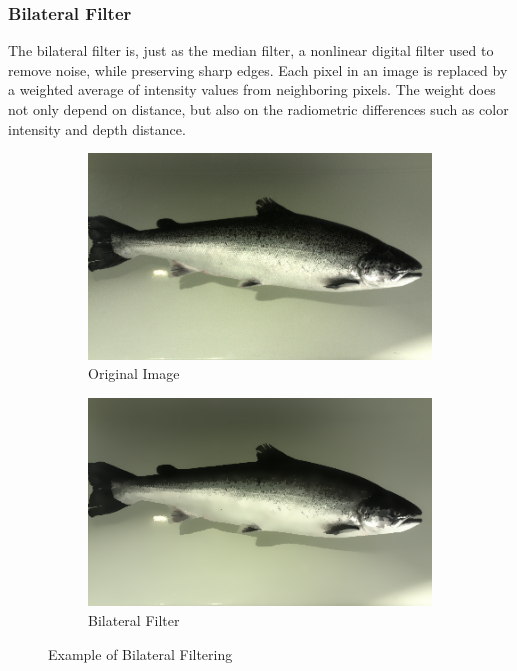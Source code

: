 \subsubsection{Bilateral Filter}
The bilateral filter is, just as the median filter, a nonlinear digital filter used to remove noise, while preserving sharp edges. Each pixel in an image is replaced by a weighted average of intensity values from neighboring pixels. The weight does not only depend on distance, but also on the radiometric differences such as color intensity and depth distance.\cite{book:digital_image_processing}\cite{website:wiki_bilateral_filter}\cite{book:machine_vision}

\begin{figure}[ht]
    \centering
    \begin{subfigure}{0.5\textwidth}
        \centering
        \includegraphics[width=.99\linewidth]{images/literature/filtering/original_fish}
        \caption{Original Image}
    \end{subfigure}%
    \begin{subfigure}{.5\textwidth}
        \centering
        \includegraphics[width=.99\linewidth]{images/literature/filtering/bilateral}
        \caption{Bilateral Filter}
        \label{fig:bilateral_filter_b}
    \end{subfigure}
    \caption{Example of Bilateral Filtering}
    \label{fig:bilateral_filter}
\end{figure}

